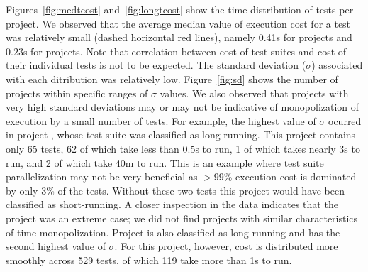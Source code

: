 \sloppy Figures~\ref{fig:medtcost} and~\ref{fig:longtcost} show the
time distribution of tests per project.  We observed that the average
median value of execution cost for a test was relatively small (dashed
horizontal red lines), namely 0.41s for \medg{} projects and 0.23s for
\longg{} projects.  Note that correlation between cost of test suites
and cost of their individual tests is not to be expected.  The
standard deviation ($\sigma$) associated with each ditribution was
relatively low.  Figure~\ref{fig:sd} shows the number of projects
within specific ranges of $\sigma$ values.  We also observed that
projects with very high standard deviations may or may not be
indicative of monopolization of execution by a small number of tests.
For example, the highest value of $\sigma$ ocurred in project
, whose test suite was classified as
long-running.  This project contains only 65 tests, 62 of which take
less than 0.5s to run, 1 of which takes nearly 3s to run, and 2 of
which take 40m to run.  This is an example where test suite
parallelization may not be very beneficial as $>$99\% execution cost
is dominated by only 3\% of the tests.  Without these two tests this
project would have been classified as short-running.  A closer
inspection in the data indicates that the project
 was an extreme case; we did not find projects
with similar characteristics of time monopolization.  Project
 is also classified as
long-running and has the second highest value of $\sigma$.  For this
project, however, cost is distributed more smoothly across 529 tests,
of which 119 take more than 1s to run.  


\begin{center}
\end{center}


